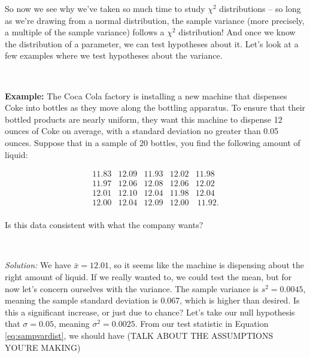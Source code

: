 So now we see why we've taken so much time to study $\chi^2$ distributions -- so long as we're drawing from a normal distribution, the sample variance (more precisely, a multiple of the sample variance) follows a $\chi^2$ distribution!  And once we know the distribution of a parameter, we can test hypotheses about it.  Let's look at a few examples where we test hypotheses about the variance.



~



\textbf{Example:} The Coca Cola factory \ex is installing a new machine that dispenses Coke into bottles as they move along the bottling apparatus.  To ensure that their bottled products are nearly uniform, they want this machine to dispense 12 ounces of Coke on average, with a standard deviation no greater than 0.05 ounces. Suppose that in a sample of 20 bottles, you find the following amount of liquid:



\begin{equation*} \begin{array}{ccccc} 11.83 & 12.09 & 11.93 & 12.02 & 11.98 \\

11.97 & 12.06 & 12.08 & 12.06 & 12.02 \\

12.01 & 12.10 & 12.04 & 11.98 & 12.04 \\

12.00 & 12.04 & 12.09 & 12.00 & \ 11.92. \\ \end{array} \end{equation*}



\noindent Is this data consistent with what the company wants?





~



\emph{Solution:} We have $\bar{x} = 12.01$, so it seems like the machine is dispensing about the right amount of liquid. If we really wanted to, we could test the mean, but for now let's concern ourselves with the variance.  The sample variance is $s^2 = 0.0045$, meaning the sample standard deviation is 0.067, which is higher than desired.  Is this a significant increase, or just due to chance?  Let's take our null hypothesis that $\sigma = 0.05$, meaning $\sigma^2 = 0.0025$.  From our test statistic in Equation \ref{eq:sampvardist}, we should have (TALK ABOUT THE ASSUMPTIONS YOU'RE MAKING)



